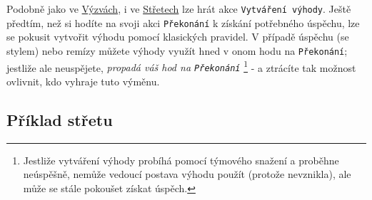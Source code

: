 Podobně jako ve \underline{Výzvách}, i ve \underline{Střetech} lze hrát akce \texttt{Vytváření výhody}. Ještě předtím, než si hodíte na svoji akci \texttt{Překonání} k získání potřebného úspěchu, lze se pokusit vytvořit výhodu pomocí klasických pravidel. V případě úspěchu (se stylem) nebo remízy můžete výhody využít hned v onom hodu na \texttt{Překonání}; jestliže ale neuspějete, \textit{propadá váš hod na \texttt{Překonání}} \footnote{Jestliže vytváření výhody probíhá pomocí týmového snažení a proběhne neúspěšně, nemůže vedoucí postava výhodu použít (protože nevznikla), ale může se stále pokoušet získat úspěch.} - a ztrácíte tak možnost ovlivnit, kdo vyhraje tuto výměnu.

\subsection{Příklad střetu}
\label{sec:příklad-střet}

